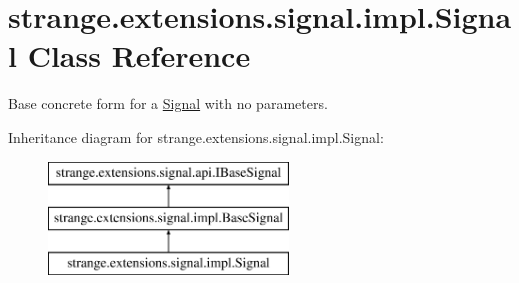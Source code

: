 \hypertarget{classstrange_1_1extensions_1_1signal_1_1impl_1_1_signal}{\section{strange.\-extensions.\-signal.\-impl.\-Signal Class Reference}
\label{classstrange_1_1extensions_1_1signal_1_1impl_1_1_signal}
}


Base concrete form for a \hyperlink{classstrange_1_1extensions_1_1signal_1_1impl_1_1_signal}{Signal} with no parameters.  


Inheritance diagram for strange.\-extensions.\-signal.\-impl.\-Signal\-:\begin{figure}[H]
\begin{center}
\leavevmode
\includegraphics[height=3.000000cm]{classstrange_1_1extensions_1_1signal_1_1impl_1_1_signal}
\end{center}
\end{figure}
